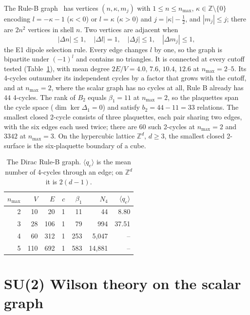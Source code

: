 \documentclass[11pt]{article}
\begin{document}
The Rule-B graph~\cite{paper29} has vertices $(n,\kappa,m_j)$ with
$1\le n\le n_{\max}$, $\kappa\in\mathbb{Z}\setminus\{0\}$ encoding
$l=-\kappa-1$ ($\kappa<0$) or $l=\kappa$ ($\kappa>0$) and $j=|\kappa|-\tfrac12$,
and $|m_j|\le j$; there are $2n^2$ vertices in shell $n$.  Two vertices are
adjacent when
\begin{equation}
|\Delta n|\le1,\quad |\Delta l|=1,\quad |\Delta j|\le1,\quad
|\Delta m_j|\le1,
\label{eq:rule_b}
\end{equation}
the E1 dipole selection rule.  Every edge changes $l$ by one, so the graph is
bipartite under $(-1)^l$ and contains no triangles.  It is connected at every
cutoff tested (Table~\ref{tab:ruleb_counts}), with mean degree $2E/V=4.0$,
$7.6$, $10.4$, $12.6$ at $n_{\max}=2$--$5$.  Its 4-cycles outnumber its
independent cycles by a factor that grows with the cutoff, and at
$n_{\max}=2$, where the scalar graph has no cycles at all, Rule B already has
$44$ 4-cycles.  The rank of $B_2$ equals $\beta_1=11$ at $n_{\max}=2$, so the
plaquettes span the cycle space ($\dim\ker\Delta_1=0$) and satisfy
$b_2=44-11=33$ relations.  The smallest closed 2-cycle consists of three
plaquettes, each pair sharing two edges, with the six edges each used twice;
there are $60$ such 2-cycles at $n_{\max}=2$ and $3342$ at $n_{\max}=3$.  On the
hypercubic lattice $\mathbb{Z}^d$, $d\ge3$, the smallest closed 2-surface is
the six-plaquette boundary of a cube.

\begin{table}[t]
\centering
\caption{The Dirac Rule-B graph.  $\langle q_e\rangle$ is the mean number of
4-cycles through an edge; on $\mathbb{Z}^d$ it is $2(d-1)$.}
\label{tab:ruleb_counts}
\begin{tabular}{rrrrrrr}
\toprule
$n_{\max}$ & $V$ & $E$ & $c$ & $\beta_1$ & $N_4$ & $\langle q_e\rangle$ \\
\midrule
2 & 10  & 20  & 1 & 11  & 44         & 8.80  \\
3 & 28  & 106 & 1 & 79  & 994        & 37.51 \\
4 & 60  & 312 & 1 & 253 & 5{,}047    & --    \\
5 & 110 & 692 & 1 & 583 & 14{,}881   & --    \\
\bottomrule
\end{tabular}
\end{table}

\section{SU(2) Wilson theory on the scalar graph}
\label{sec:su2}
\end{document}

